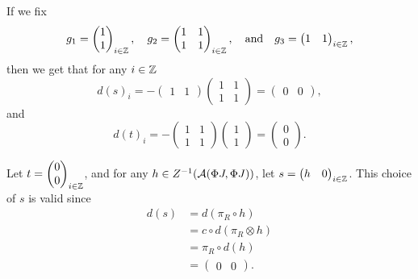 \begin{example}
    If we fix
    \[
        g_1 = \begin{pmatrix} 1 \\ 1 \end{pmatrix}_{i \in {\mathbb{Z}}}, \quad g_2 = \begin{pmatrix} 1 & 1 \\ 1 & 1 \end{pmatrix}_{i \in {\mathbb{Z}}}, \quad \text{and} \quad g_3 = \begin{pmatrix} 1 & 1 \end{pmatrix}_{i \in {\mathbb{Z}}},
    \]
    then we get that for any \( i \in {\mathbb{Z}} \)
    \[
        d(s)_i = - \begin{pmatrix} 1 & 1 \end{pmatrix} \begin{pmatrix} 1 & 1 \\ 1 & 1 \end{pmatrix} = \begin{pmatrix} 0 & 0 \end{pmatrix},
    \]
    and
    \[
        d(t)_i = - \begin{pmatrix} 1 & 1 \\ 1 & 1 \end{pmatrix} \begin{pmatrix} 1 \\ 1 \end{pmatrix} = \begin{pmatrix} 0 \\ 0 \end{pmatrix}.
    \]

    Let \( t = \begin{pmatrix} 0 \\ 0 \end{pmatrix}_{i \in {\mathbb{Z}}} \), and for any \( h \in Z^{-1}({\mathcal{A}}(\Phi J, \Phi J)) \), let \( s = \begin{pmatrix} h & 0 \end{pmatrix}_{i \in {\mathbb{Z}}} \). This choice of \( s \) is valid since
    \begin{align*}
        d(s) &= d( \pi_R \circ h ) \\
        &= c \circ d (\pi_R \otimes h) \\
        &= \pi_R \circ d(h) \\
        &= \begin{pmatrix} 0 & 0 \end{pmatrix}.
    \end{align*}
    

\end{example}

